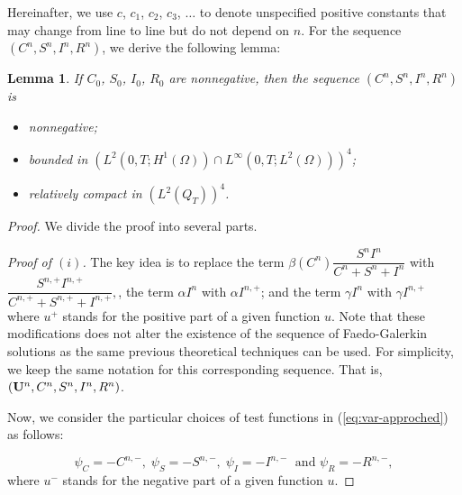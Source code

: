 \documentclass[10pt,number,preprint,times]{elsarticle}
\numberwithin{equation}{section} %
\newtheorem{lem}{Lemma}[section]
\begin{document}
	Hereinafter, we use $c$, $c_1$, $c_2$, $c_3$, $\ldots$ to denote unspecified positive constants that may change from line to line but do not depend on $n$.
    For the sequence $(C^n,S^n,I^n,R^n)$, we derive the following lemma:
	\begin{lem}\label{lem-2}
		If $C_0$, $S_0$, $I_0$, $R_0$ are nonnegative,  then the sequence $(C^n,S^n,I^n,R^n)$ is
		\begin{itemize}
			\item[(i)] nonnegative;
			\item[(ii)] bounded in
			$(L^2(0,T;H^1(\Omega))\cap L^\infty(0,T;L^2(\Omega)))^4$;
			\item[(iii)] relatively compact in $(L^2(Q_T))^4$.
		\end{itemize}
	\end{lem}
	\begin{proof}
We divide the proof into several parts. 


\textit{Proof of $(i)$.} 
The key idea is to replace the term $ \beta(C^n) \dfrac{S^n I^n}{C^n+S^n+I^n}
$
with
$
\dfrac{S^{n,+} I^{n,+}}{C^{n,+}+S^{n,+}+I^{n,+}},
$, the term $\alpha I^{n}$ with $\alpha I^{n,+}$; and the term $\gamma  I^{n}$ with $\gamma  I^{n,+}$
where $u^{+}$ stands for the positive part of a given function $u$. Note that these modifications does not alter the existence of the sequence of Faedo-Galerkin solutions as the same previous theoretical techniques can be used. For simplicity, we keep the same notation for this corresponding sequence. That is,  $(\bold{U}^n,C^n,S^n,I^n,R^n)$. 

\noindent
Now, we consider the particular choices of test functions in (\ref {eq:var-approched}) as follows:  



$$\psi_C=-C^{n,-},\;  \psi_S=-S^{n,-},\; \psi_I=-I^{n,-}\; \text{ and } \psi_R=-R^{n,-},$$
	where $u^-$ stands for the negative part of a given function $u$.



\end{proof}
\end{document}

